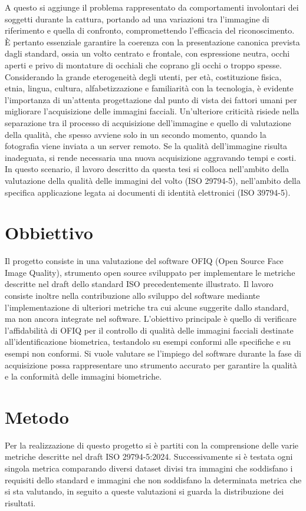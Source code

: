 \documentclass[12pt,a4paper,openright,twoside]{book}
\begin{document}
A questo si aggiunge il problema rappresentato da comportamenti involontari dei soggetti durante la cattura, portando ad una  variazioni tra l’immagine di riferimento e quella di confronto, compromettendo l’efficacia del riconoscimento.
È pertanto essenziale garantire la coerenza con la presentazione canonica prevista dagli standard, ossia un volto centrato e frontale, con espressione neutra, occhi aperti e privo di montature di occhiali che coprano gli occhi o troppo spesse.
Considerando la grande eterogeneità degli utenti, per età, costituzione fisica, etnia, lingua, cultura, alfabetizzazione e familiarità con la tecnologia, è evidente l'importanza di un’attenta progettazione dal punto di vista dei fattori umani per migliorare l'acquisizione delle immagini facciali.
Un’ulteriore criticità risiede nella separazione tra il processo di acquisizione dell’immagine e quello di valutazione della qualità, che spesso avviene solo in un secondo momento, quando la fotografia viene inviata a un server remoto.
Se la qualità dell’immagine risulta inadeguata, si rende necessaria una nuova acquisizione aggravando tempi e costi.
In questo scenario, il lavoro descritto da questa tesi si colloca nell’ambito della valutazione della qualità delle immagini del volto (ISO 29794-5), nell'ambito della specifica applicazione legata ai documenti di identità elettronici (ISO 39794-5).
\section{Obbiettivo}
Il progetto consiste in una valutazione del software OFIQ (Open Source Face Image Quality), strumento open source sviluppato per implementare le metriche descritte nel draft dello standard ISO precedentemente illustrato. Il lavoro consiste inoltre nella contribuzione allo sviluppo del software mediante l’implementazione di ulteriori metriche tra cui alcune suggerite dallo standard, ma non ancora integrate nel software. L’obiettivo principale è quello di verificare l’affidabilità di OFIQ per il controllo di qualità delle immagini facciali destinate all’identificazione biometrica, testandolo su esempi conformi alle specifiche e su esempi non conformi. Si vuole valutare se l’impiego del software durante la fase di acquisizione possa rappresentare uno strumento accurato per garantire la qualità e la conformità delle immagini biometriche.  

\section{Metodo}
Per la realizzazione di questo progetto si è partiti con la comprensione delle varie metriche descritte nel draft ISO 29794-5:2024.
Successivamente si è testata ogni singola metrica comparando diversi dataset divisi tra immagini che soddisfano i requisiti dello standard e immagini che non soddisfano la determinata metrica che si sta valutando, in seguito a queste valutazioni si guarda la distribuzione dei risultati. 
\end{document}
